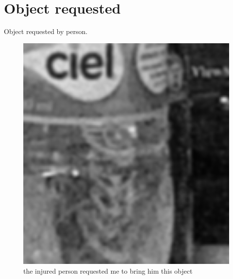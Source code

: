 \documentclass[11pt]{article}
\begin{document}
\section{Object requested}

Object requested by person.

\begin{figure}[h]
	\begin{center}
		\includegraphics[width=1\textwidth]{../data/EmergencyReport/EmergencyObjectRequested.png}
		\caption{the injured person requested me to bring him this object}
	\end{center}
\end{figure}
\end{document}
